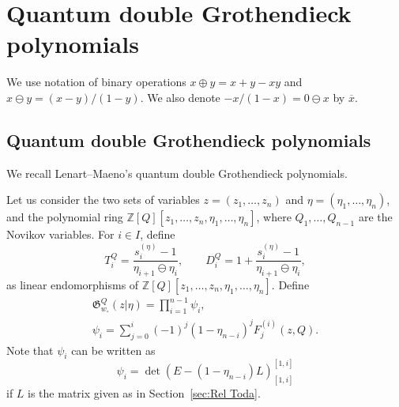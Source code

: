 \documentclass[10pt,a4paper]{amsart}
\numberwithin{equation}{section}
\newcommand{\Gro}[1]{\mathfrak{G}^Q_{#1}}
\newcommand{\wz}{w_\circ}
\newcommand{\Z}{\mathbb{Z}}
\newcommand{\fac}{\psi}
\theoremstyle{definition}
\begin{document}
\section{Quantum double Grothendieck polynomials}\label{sec:Groth}
We use notation of binary operations $x\oplus y=x+y-xy$ and
$x\ominus y=(x-y)/(1-y)$.
We also denote $-x/(1-x)=0\ominus x$ by $\overline{x}$.


\subsection{Quantum double Grothendieck polynomials}
\label{sec:G^Q(z|eta)}
We recall
Lenart--Maeno's
quantum double Grothendieck polynomials.



Let us consider
the two sets of variables
$z=(z_1,\dots,z_n)$ and
$\eta=(\eta_1,\dots,\eta_n)$, and the polynomial ring
$\Z[Q][z_1,\dots,z_n,\eta_1,\dots,\eta_n]$,
where $Q_1,\dots,Q_{n-1}$ are the Novikov variables.
For $i\in I$, define
\begin{equation}
\label{eq:DiQ,TiQ}
T_i^Q
=\frac{s_i^{(\eta)}-1}{\eta_{i+1}\ominus \eta_{i}},\qquad
D_i^Q
=1+\frac{s_i^{(\eta)}-1}{\eta_{i+1}\ominus \eta_{i}},
\end{equation}
as linear endomorphisms of
$\Z[Q][z_1,\dots,z_n,\eta_1,\dots,\eta_n]$.
Define
\begin{gather}
\label{eq:G_longest}
\Gro{\wz}(z|\eta)=
\prod_{i=1}^{n-1}
\fac_i,\\
\fac_i=\sum_{j=0}^i
(-1)^j
(1-\eta_{n-i})^j
F_j^{(i)}(z,Q).
\label{eq:def phi}
\end{gather}
Note that $\fac_i$ can be written as
\begin{equation}
\label{eq:phi det}
\fac_i=\det(E-(1-\eta_{n-i})L)^{[1,i]}_{[1,i]}
\end{equation}
if $L$ is the matrix given as in Section~\ref{sec:Rel Toda}.
\end{document}
